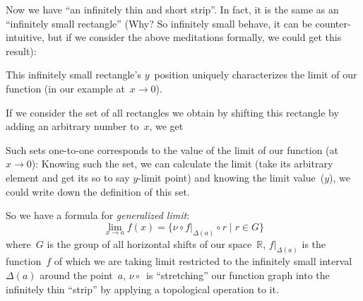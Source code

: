 \documentclass{amsart}
\begin{document}
Now we have ``an infinitely thin and short strip''. In fact, it is the same as an ``infinitely small rectangle'' (Why? So infinitely small behave, it can be counter-intuitive, but if we consider the above meditations formally, we could get this result):
\begin{figure}[H]
\end{figure}

This infinitely small rectangle's $y$~position uniquely characterizes the limit of our function (in our example at~$x\to 0$).

If we consider the set of all rectangles we obtain by shifting this rectangle by adding an arbitrary number to~$x$, we get
\begin{figure}[H]
\end{figure}
Such sets one-to-one corresponds to the value of the limit of our function (at $x\to 0$): Knowing such the set, we can calculate the limit (take its arbitrary element and get its so to say $y$-limit point) and knowing the limit value~($y$), we could write down the definition of this set.

So we have a formula for \emph{generalized limit}:
\[ \lim_{x\to a} f(x) =
\{ \nu \circ f|_{\Delta(a)} \circ r \mid r\in G \} \]
where~$G$ is the group of all horizontal shifts of our space~$\mathbb{R}$, $f|_{\Delta(a)}$ is the function~$f$ of which we are taking limit restricted to the infinitely small interval~$\Delta(a)$ around the point~$a$, $\nu\circ{}$~is ``stretching'' our function graph into the infinitely thin ``strip'' by applying a topological operation to it.
\end{document}
